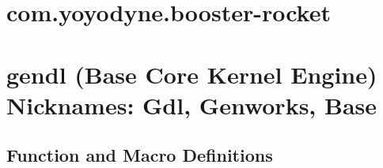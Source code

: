 \documentclass [11pt]{book}
\begin{document}
\section{com.yoyodyne.booster-rocket }

\label{sec:com.yoyodyne.booster-rocket}







\section{gendl (Base Core Kernel Engine) Nicknames: Gdl, Genworks, Base}

\label{sec:gendl(basecorekernelengine)nicknames:gdl,genworks,base}





\subsection{Function and Macro Definitions}
\end{document}

